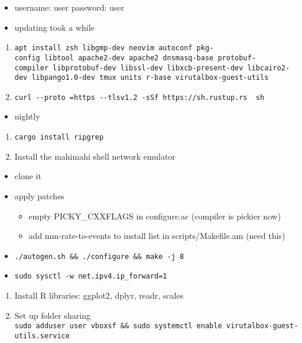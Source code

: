 \documentclass[letterpaper,twocolumn,10pt]{article}
\providecommand{\tightlist}{%
  \setlength{\itemsep}{0pt}\setlength{\parskip}{0pt}}
\begin{document}
{\begin{itemize}
\tightlist
\item
  username: user password: user
\item
  updating took a while
\end{itemize}

\begin{enumerate}
\def\labelenumi{\arabic{enumi}.}
\setcounter{enumi}{2}
\tightlist
\item
  \texttt{apt\ install\ zsh\ libgmp-dev\ neovim\ autoconf\ pkg-config\ libtool\ apache2-dev\ apache2\ dnsmasq-base\ protobuf-compiler\ libprotobuf-dev\ libssl-dev\ libxcb-present-dev\ libcairo2-dev\ libpango1.0-dev\ tmux\ units\ r-base\ virutalbox-guest-utils}
\item
  \texttt{curl\ -\/-proto\ \textquotesingle{}=https\textquotesingle{}\ -\/-tlsv1.2\ -sSf\ https://sh.rustup.rs\ \textbar{}\ sh}
\end{enumerate}

\begin{itemize}
\tightlist
\item
  nightly
\end{itemize}

\begin{enumerate}
\def\labelenumi{\arabic{enumi}.}
\setcounter{enumi}{4}
\tightlist
\item
  \texttt{cargo\ install\ ripgrep}
\item
  Install the mahimahi shell network emulator
\end{enumerate}

\begin{itemize}
\tightlist
\item
  clone it
\item
  apply patches

  \begin{itemize}
  \tightlist
  \item
    empty PICKY\_CXXFLAGS in configure.ac (compiler is pickier now)
  \item
    add mm-rate-to-events to install list in scripts/Makefile.am (need
    this)
  \end{itemize}
\item
  \texttt{./autogen.sh\ \&\&\ ./configure\ \&\&\ make\ -j\ 8}
\item
  \texttt{sudo\ sysctl\ -w\ net.ipv4.ip\_forward=1}
\end{itemize}

\begin{enumerate}
\def\labelenumi{\arabic{enumi}.}
\setcounter{enumi}{6}
\tightlist
\item
  Install R libraries: ggplot2, dplyr, readr, scales
\item
  Set up folder sharing
  \texttt{sudo\ adduser\ user\ vboxsf\ \&\&\ sudo\ systemctl\ enable\ virutalbox-guest-utils.service}
\end{enumerate}

}
\end{document}
